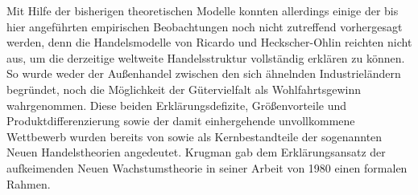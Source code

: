 Mit Hilfe der bisherigen theoretischen Modelle konnten allerdings einige der bis hier angef{\"u}hrten empirischen Beobachtungen noch nicht zutreffend vorhergesagt werden, denn die Handelsmodelle von Ricardo und Heckscher-Ohlin reichten nicht aus, um die derzeitige weltweite Handelsstruktur vollst{\"a}ndig erkl{\"a}ren zu k{\"o}nnen. So wurde weder der Au{\ss}enhandel zwischen den sich {\"a}hnelnden Industriel{\"a}ndern begr{\"u}ndet, noch die M{\"o}glichkeit der G{\"u}tervielfalt als Wohlfahrtsgewinn wahrgenommen. Diese beiden Erkl{\"a}rungsdefizite, Gr{\"o}{\ss}envorteile und Produktdifferenzierung sowie der damit einhergehende unvollkommene Wettbewerb wurden bereits von \citet{Balassa.1967,Kravis.1978} sowie \citet{Grubel.1967,Grubel.1970} als Kernbestandteile der sogenannten Neuen Handelstheorien angedeutet. Krugman gab dem Erkl{\"a}rungsansatz der aufkeimenden Neuen Wachstumstheorie in seiner Arbeit von 1980 einen formalen Rahmen.
